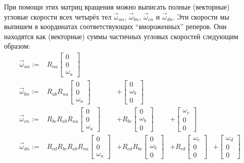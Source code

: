 \documentclass{article}
\begin{document}
При помощи этих матриц вращения можно выписать полные (векторные) угловые скорости всех четырёх тел $\vec\omega_{an}$, $\vec\omega_{bn}$, $\vec\omega_{cn}$ и $\vec\omega_{dn}$.
Эти скорости мы выпишем в координатах соответствующих ``вмороженных'' реперов. Они находятся как (векторные) суммы частичных угловых скоростей следующим образом:
$$
\begin{array}{rrrrl}
\vec \omega_{an} := &                   R_{na}\begin{bmatrix}0\\0\\\omega_a\end{bmatrix} &&&\\
\vec \omega_{bn} := &             R_{ab}R_{na}\begin{bmatrix}0\\0\\\omega_a\end{bmatrix} &+             \begin{bmatrix}0\\\omega_b\\0\end{bmatrix} & &\\
\vec \omega_{cn} := &       R_{bc}R_{ab}R_{na}\begin{bmatrix}0\\0\\\omega_a\end{bmatrix} &+       R_{bc}\begin{bmatrix}0\\\omega_b\\0\end{bmatrix} &+ \begin{bmatrix}\omega_c\\0\\0\end{bmatrix}&\\
\vec \omega_{dn} := & R_{cd}R_{bc}R_{ab}R_{na}\begin{bmatrix}0\\0\\\omega_a\end{bmatrix} &+ R_{cd}R_{bc}\begin{bmatrix}0\\\omega_b\\0\end{bmatrix} &+ R_{cd}\begin{bmatrix}\omega_c\\0\\0\end{bmatrix} &+ \begin{bmatrix}\omega_d\\0\\0\end{bmatrix}\\
\end{array}
$$
\end{document}
